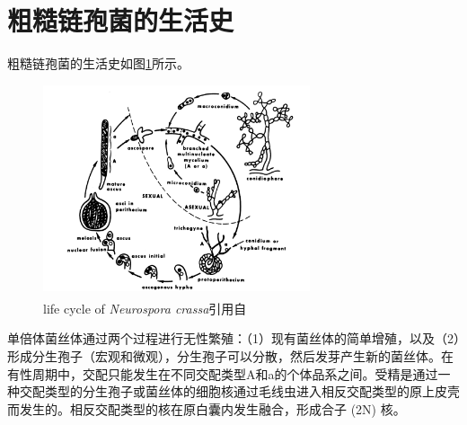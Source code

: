\documentclass[]{LZUThesis}
\newcommand{\upcite}[1]{\textsuperscript{\textsuperscript{\cite{#1}}}}
\begin{document}
\section{粗糙链孢菌的生活史}
粗糙链孢菌的生活史如图\ref{fig:1}所示。\par
\begin{figure}[htbp]
    \centering
    \includegraphics[width=0.7\textwidth]{img/lifecircle.png}
    \caption{life cycle of \textit{Neurospora crassa}引用自\upcite{doi:10.1128/jb.113.2.1015-1025.1973}}
    \label{fig:1}
\end{figure}
单倍体菌丝体通过两个过程进行无性繁殖：（1）现有菌丝体的简单增殖，以及（2）形成分生孢子（宏观和微观），分生孢子可以分散，然后发芽产生新的菌丝体。在有性周期中，交配只能发生在不同交配类型A和a的个体品系之间。受精是通过一种交配类型的分生孢子或菌丝体的细胞核通过毛线虫进入相反交配类型的原上皮壳而发生的。相反交配类型的核在原白囊内发生融合，形成合子 (2N) 核。
\end{document}

